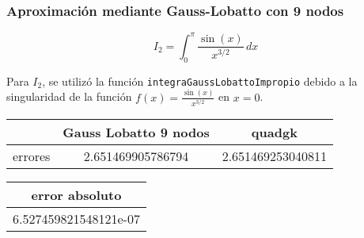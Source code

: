\documentclass{beamer}
\begin{document}

\begin{frame} 
\frametitle{Aproximación mediante Gauss-Lobatto con 9 nodos}

\[
\displaystyle I_2 = \int_{0}^{\pi} \! \frac{\sin(x)}{x^{3/2}} \, dx
\]

Para \( I_2 \), se utilizó la función \texttt{integraGaussLobattoImpropio} debido a la singularidad de la función \( f(x) = \frac{\sin(x)}{x^{3/2}} \) en \( x = 0 \).

\vspace{1em}

\begin{table}[h]
    \centering
    \begin{tabular}{|c|c|c|}
        \hline
        \rowcolor{gray!30}
         & Gauss Lobatto 9 nodos & quadgk \\
        \hline
         errores & 2.651469905786794 & 2.651469253040811 \\
        \hline
    \end{tabular}
\end{table}

\vspace{0.5em}

\begin{table}[h]
    \centering
    \begin{tabular}{|c|}
        \hline
        \rowcolor{gray!30}
         error absoluto \\
        \hline
         6.527459821548121e-07 \\
        \hline
    \end{tabular}
\end{table}
\end{frame}


\end{document}
